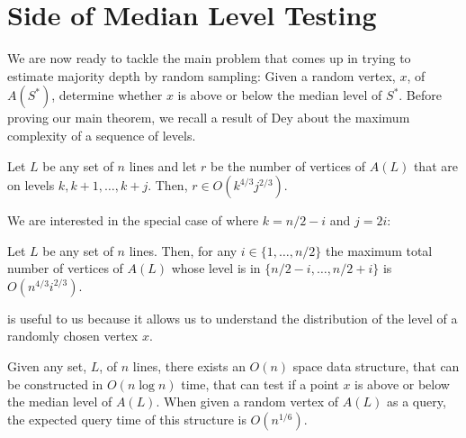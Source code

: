 \documentclass{patmorin}
\begin{document}

\section{Side of Median Level Testing}

We are now ready to tackle the main problem that comes up in trying to
estimate majority depth by random sampling:  Given a random vertex,
$x$, of $A(S^*)$, determine whether $x$ is above or below the median
level of $S^*$.  Before proving our main theorem, we recall a result of
Dey \cite[Theorem~4.2]{d98} about the maximum complexity of a sequence
of levels.

\begin{lem}
 Let $L$ be any set of $n$ lines and let $r$ be the number of vertices
 of $A(L)$ that are on levels $k,k+1,\ldots,k+j$.  Then, $r \in
 O(k^{4/3}j^{2/3})$.
\end{lem}

We are interested in the special case of  where $k=n/2-i$
and $j=2i$:

\begin{cor}
  Let $L$ be any set of $n$ lines.  Then, for any $i\in\{1,\ldots,n/2\}$
  the maximum total number of vertices of $A(L)$ whose level is in
  $\{n/2-i,\ldots,n/2+i\}$ is $O(n^{4/3}i^{2/3})$.
\end{cor}

 is useful to us because it allows us to understand the
distribution of the level of a randomly chosen vertex $x$.

\begin{thm}
  Given any set, $L$, of $n$ lines, there exists an $O(n)$ space data
  structure, that can be constructed in $O(n\log n)$ time, that can test
  if a point $x$ is above or below the median level of $A(L)$.  When given
  a random vertex of $A(L)$ as a query, the expected query time of this
  structure is $O(n^{1/6})$.
\end{thm}
\end{document}
